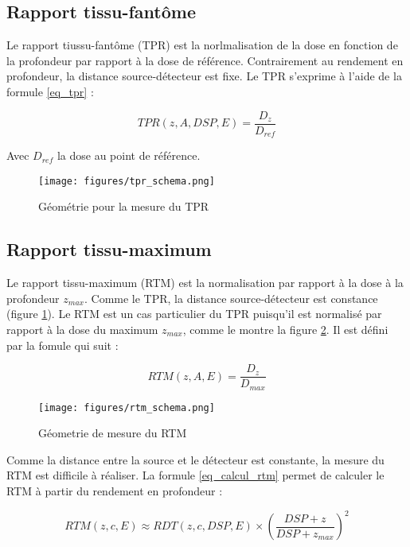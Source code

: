 \documentclass{article}
\begin{document}
\subsection{Rapport tissu-fantôme}

Le rapport tiussu-fantôme (TPR) est la norlmalisation de la dose en fonction de la profondeur par rapport à la dose de référence. Contrairement au rendement en profondeur, la distance source-détecteur est fixe. Le TPR s'exprime à l'aide de la formule \ref{eq_tpr} :

\begin{equation}
    TPR(z, A, DSP, E) = \dfrac{D_z}{D_{ref}}
    \label{eq_tpr}
\end{equation}

Avec $D_{ref}$ la dose au point de référence.

\begin{figure}[h] 
  \centering
  \texttt{[image: figures/tpr\_schema.png]}
  \caption{Géométrie pour la mesure du TPR \cite{podgorsak2005radiation}}
  \label{fig_tpr}
\end{figure}

\subsection{Rapport tissu-maximum}

Le rapport tissu-maximum (RTM) est la normalisation par rapport à la dose à la profondeur $z_{max}$. Comme le TPR, la distance source-détecteur est constance (figure \ref*{fig_tpr}). Le RTM est un cas particulier du TPR puisqu'il est normalisé par rapport à la dose du maximum $z_{max}$, comme le montre la figure \ref*{fig_rtm}. Il est défini par la fomule qui suit :

\begin{equation}
    RTM(z, A, E) = \dfrac{D_z}{D_{max}}
    \label{eq_rtm}
\end{equation}

\begin{figure}[h]
  \centering
  \texttt{[image: figures/rtm\_schema.png]}
  \caption{Géometrie de mesure du RTM \cite{podgorsak2005radiation}}
  \label{fig_rtm}
\end{figure}

Comme la distance entre la source et le détecteur est constante, la mesure du RTM est difficile à réaliser. La formule \ref{eq_calcul_rtm} permet de calculer le RTM à partir du rendement en profondeur :

\begin{equation}
    RTM(z, c, E) \approx RDT(z, c, DSP, E) \times \left(\dfrac{DSP + z}{DSP + z_{max}}\right)^2
    \label{eq_calcul_rtm}
\end{equation}
\end{document}
